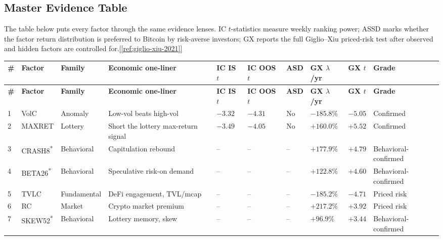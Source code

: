 \documentclass[11pt,a4paper]{article}
\newcommand{\ieeecite}[1]{\hyperref[ref:#1]{[\ref*{ref:#1}]}}
\begin{document}
\subsection{Master Evidence Table}

The table below puts every factor through the same evidence lenses. IC $t$-statistics measure weekly ranking power; ASSD marks whether the factor return distribution is preferred to Bitcoin by risk-averse investors; GX reports the full Giglio--Xiu priced-risk test after observed and hidden factors are controlled for.\ieeecite{giglio-xiu-2021}

\begin{center}
\scriptsize
\setlength{\tabcolsep}{2.2pt}
\begin{longtable}{C{0.03\textwidth}L{0.095\textwidth}L{0.105\textwidth}L{0.22\textwidth}R{0.065\textwidth}R{0.07\textwidth}C{0.06\textwidth}R{0.08\textwidth}R{0.055\textwidth}L{0.12\textwidth}}
\toprule
{}
\textbf{\#} & \textbf{Factor} & \textbf{Family} & \textbf{Economic one-liner} & \textbf{IC IS $t$} & \textbf{IC OOS $t$} & \textbf{ASD} & \textbf{GX $\lambda$/yr} & \textbf{GX $t$} & \textbf{Grade} \\
\midrule
\endfirsthead
\toprule
{}
\textbf{\#} & \textbf{Factor} & \textbf{Family} & \textbf{Economic one-liner} & \textbf{IC IS $t$} & \textbf{IC OOS $t$} & \textbf{ASD} & \textbf{GX $\lambda$/yr} & \textbf{GX $t$} & \textbf{Grade} \\
\midrule
{} & VolC & Anomaly & Low-vol beats high-vol & $-3.32$ & $-4.31$ & No & $-185.8\%$ & $-5.05$ & Confirmed \\
2 & MAXRET & Lottery & Short the lottery max-return signal & $-3.49$ & $-4.05$ & No & $+160.0\%$ & $+5.52$ & Confirmed \\
3 & CRASH8\textsuperscript{*} & Behavioral & Capitulation rebound & -- & -- & -- & $+177.9\%$ & $+4.79$ & Behavioral-confirmed \\
4 & BETA26\textsuperscript{*} & Behavioral & Speculative risk-on demand & -- & -- & -- & $+122.8\%$ & $+4.60$ & Behavioral-confirmed \\
5 & TVLC & Fundamental & DeFi engagement, TVL/mcap & -- & -- & -- & $-185.2\%$ & $-4.71$ & Priced risk \\
6 & RC & Market & Crypto market premium & -- & -- & -- & $+217.2\%$ & $+3.92$ & Priced risk \\
7 & SKEW52\textsuperscript{*} & Behavioral & Lottery memory, skew & -- & -- & -- & $+96.9\%$ & $+3.44$ & Behavioral-confirmed \\

\end{longtable}
\end{center}
\end{document}
